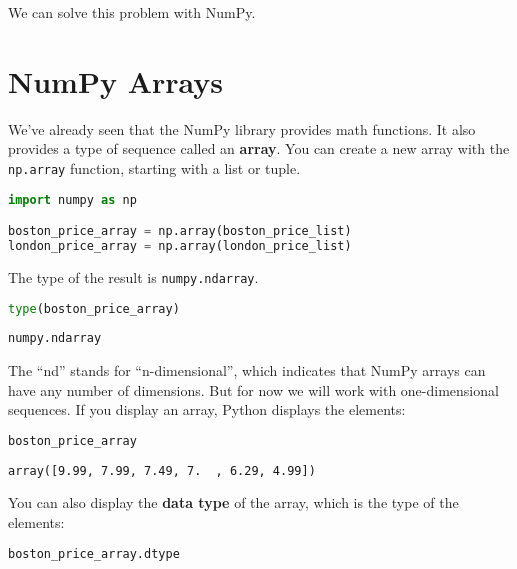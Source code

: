 We can solve this problem with NumPy.

\section{NumPy Arrays}\label{numpy-arrays}

We've already seen that the NumPy library provides math functions. It
also provides a type of sequence called an \textbf{array}. You can
create a new array with the \passthrough{\lstinline!np.array!} function,
starting with a list or tuple.

\begin{lstlisting}[language=Python,style=source]
import numpy as np

boston_price_array = np.array(boston_price_list)
london_price_array = np.array(london_price_list)
\end{lstlisting}

\pagebreak

The type of the result is \passthrough{\lstinline!numpy.ndarray!}.

\begin{lstlisting}[language=Python,style=source]
type(boston_price_array)
\end{lstlisting}

\begin{lstlisting}[style=output]
numpy.ndarray
\end{lstlisting}

The ``nd'' stands for ``n-dimensional'', which indicates that NumPy
arrays can have any number of dimensions. But for now we will work with
one-dimensional sequences. If you display an array, Python displays the
elements:

\begin{lstlisting}[language=Python,style=source]
boston_price_array
\end{lstlisting}

\begin{lstlisting}[style=output]
array([9.99, 7.99, 7.49, 7.  , 6.29, 4.99])
\end{lstlisting}

You can also display the \textbf{data type} of the array, which is the
type of the elements:

\begin{lstlisting}[language=Python,style=source]
boston_price_array.dtype
\end{lstlisting}

